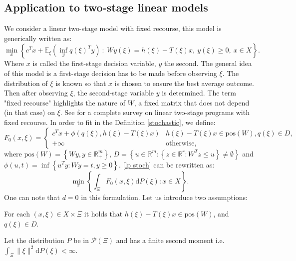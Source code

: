 \documentclass{amsart}
\newcommand{\RR}{\mathbb{R}}
\begin{document}
\subsection{Application to two-stage linear models}\label{two stage}
We consider a linear two-stage model with fixed recourse, this model is generically written as: 
\begin{equation}\label{lp stoch}
    \min_x\left\{c^Tx + \mathbb{E}_\xi\left(\inf_y q\left(\xi\right)^Ty \right)\: :\: Wy\left(\xi\right)=h\left(\xi\right)-T\left(\xi\right)x,\: y\left(\xi\right)\geq0,\: x\in X \right\}.
\end{equation}
Where $x$ is called the first-stage decision variable, $y$ the second. The general idea of this model is a first-stage decision has to be made before observing $\xi$. The distribution of $\xi$ is known so that $x$ is chosen to ensure the best average outcome. Then after observing $\xi$, the second-stage variable $y$ is determined. The term "fixed recourse" highlights the nature of $W$, a fixed matrix that does not depend (in that case) on $\xi$. See \cite{wets_stochastic_1974} for a complete survey on linear two-stage programs with fixed recourse. In order to fit in the Definition \ref{stochastic}, we define:
$$
F_0\left(x,\xi\right)=\begin{cases} 
  c^Tx + \phi\left(q\left(\xi\right), h\left(\xi\right) -T\left(\xi\right)x\right) & h\left(\xi\right)-     T\left(\xi\right)x \in \text{pos}\left(W\right), q\left(\xi\right) \in D, \\
  +\infty & \text{otherwise},
\end{cases}
$$
where $\text{pos}(W)=\left\{Wy, y\in\RR_+^m\right\}$, $D=\left\{u\in\RR^m:\left\{z\in\RR^r:W^Tz \leq u\right\}\ne \emptyset\right\}$ and  \\$\phi\left(u,t\right)=\inf\left\{ u^Ty : Wy=t, y\geq0\right\}$. \ref{lp stoch} can be rewritten as:
\begin{equation}\label{rewrite}
    \min_x\left\{\int_\Xi F_0\left(x,\xi\right)\text{d}P\left(\xi\right): x\in X\right\}. 
\end{equation}
One can note that $d=0$ in this formulation. Let us introduce two assumptions: 
\begin{assumption}\label{h1} For each $\left(x,\xi\right)\in X\times \Xi$ it holds that $h\left(\xi\right)- T\left(\xi\right)x\in \text{pos}\left(W\right)$, and $q\left(\xi\right) \in D$.
\end{assumption}
\begin{assumption}
\label{h2} Let the distribution $P$ be in $\mathcal{P}\left(\Xi\right)$ and has a finite second moment i.e. $\int_\Xi \lVert \xi\rVert^2\text{d}P\left(\xi\right) < \infty$.
\end{assumption}
\end{document}

